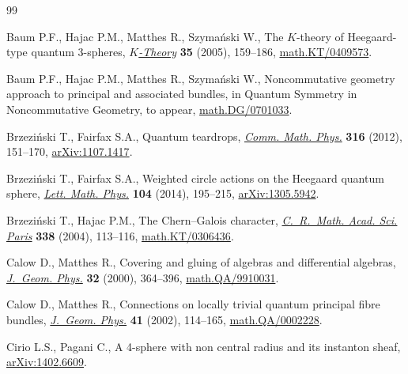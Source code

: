 \documentclass[pdftex]{sigma}
\begin{document}
\vspace{-2mm}

\begin{thebibliography}{99}
\footnotesize \itemsep=-1pt

Baum P.F., Hajac P.M., Matthes R., Szyma{\'n}ski W., The {$K$}-theory of
  {H}eegaard-type quantum 3-spheres, \href{http://dx.doi.org/10.1007/s10977-005-1550-y}{\textit{$K$-Theory}} \textbf{35} (2005),
  159--186, \href{http://arxiv.org/abs/math.KT/0409573}{math.KT/0409573}.

Baum P.F., Hajac P.M., Matthes R., Szyma\'nski W., Noncommutative geometry
  approach to principal and associated bundles, in Quantum Symmetry in
  Noncommutative Geometry, {t}o appear, \href{http://arxiv.org/abs/math.DG/0701033}{math.DG/0701033}.

Brzezi{\'n}ski T., Fairfax S.A., Quantum teardrops, \href{http://dx.doi.org/10.1007/s00220-012-1580-2}{\textit{Comm. Math. Phys.}}
  \textbf{316} (2012), 151--170, \href{http://arxiv.org/abs/1107.1417}{arXiv:1107.1417}.

Brzezi{\'n}ski T., Fairfax S.A., Weighted circle actions on the {H}eegaard
  quantum sphere, \href{http://dx.doi.org/10.1007/s11005-013-0664-z}{\textit{Lett. Math. Phys.}} \textbf{104} (2014), 195--215,
  \href{http://arxiv.org/abs/1305.5942}{arXiv:1305.5942}.

Brzezi{\'n}ski T., Hajac P.M., The {C}hern--{G}alois character,
  \href{http://dx.doi.org/10.1016/j.crma.2003.11.009}{\textit{C.~R.~Math. Acad. Sci. Paris}} \textbf{338} (2004), 113--116,
  \href{http://arxiv.org/abs/math.KT/0306436}{math.KT/0306436}.

Calow D., Matthes R., Covering and gluing of algebras and differential
  algebras, \href{http://dx.doi.org/10.1016/S0393-0440(99)00035-2}{\textit{J.~Geom. Phys.}} \textbf{32} (2000), 364--396,
  \href{http://arxiv.org/abs/math.QA/9910031}{math.QA/9910031}.

Calow D., Matthes R., Connections on locally trivial quantum principal fibre
  bundles, \href{http://dx.doi.org/10.1016/S0393-0440(01)00050-X}{\textit{J.~Geom. Phys.}} \textbf{41} (2002), 114--165,
  \href{http://arxiv.org/abs/math.QA/0002228}{math.QA/0002228}.

Cirio L.S., Pagani C., A 4-sphere with non central radius and its instanton
  sheaf, \href{http://arxiv.org/abs/1402.6609}{arXiv:1402.6609}.


\end{thebibliography}
\end{document}
